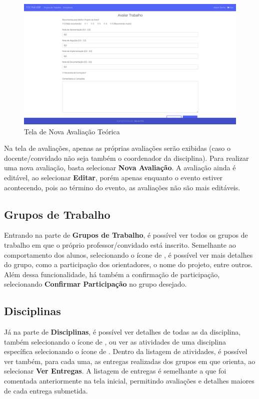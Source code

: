 \begin{figure}[H]
    \centering
    \includegraphics[scale=0.3]{imagens/tela_nova_avaliacao.png}
    \caption{Tela de Nova Avaliação Teórica}
    \label{fig:evaluations-new}
\end{figure}

Na tela de avaliações, apenas as próprias avaliações serão exibidas (caso o docente/convidado não seja também o coordenador da disciplina). Para realizar uma nova avaliação, basta selecionar \textbf{Nova Avaliação}. A avaliação ainda é editável, ao selecionar \textbf{Editar}, porém apenas enquanto o evento estiver acontecendo, pois ao término do evento, as avaliações não são mais editáveis.

\subsection{Grupos de Trabalho}
Entrando na parte de \textbf{Grupos de Trabalho}, é possível ver todos os grupos de trabalho em que o próprio professor/convidado está inscrito. Semelhante ao comportamento dos alunos, selecionando o ícone de \faEye, é possível ver mais detalhes do grupo, como a participação dos orientadores, o nome do projeto, entre outros.
Além dessa funcionalidade, há também a confirmação de participação, selecionando \textbf{Confirmar Participação} no grupo desejado.

\subsection{Disciplinas}
Já na parte de \textbf{Disciplinas}, é possível ver detalhes de todas as da disciplina, também selecionando o ícone de \faEye, ou ver as atividades de uma disciplina específica selecionando o ícone de \faListUl. Dentro da listagem de atividades, é possível ver também, para cada uma, as entregas realizadas dos grupos em que orienta, ao selecionar \textbf{Ver Entregas}. A listagem de entregas é semelhante a que foi comentada anteriormente na tela inicial, permitindo avaliações e detalhes maiores de cada entrega submetida.


